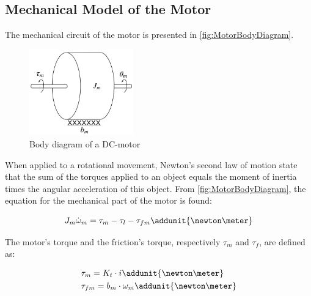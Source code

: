 \subsection*{Mechanical Model of the Motor}
The mechanical circuit of the motor is presented in \autoref{fig:MotorBodyDiagram}.

\begin{figure}[htbp]
	\centering
 	\includegraphics[width=0.4\textwidth]{figures/modeling/Motor/DCMotorMechanic.pdf} 
 	\caption{Body diagram of a DC-motor}
 	\label{fig:MotorBodyDiagram}
\end{figure}

When applied to a rotational movement, Newton's second law of motion state that the sum of the torques applied to an object equals the moment of inertia times the angular acceleration of this object. From \autoref{fig:MotorBodyDiagram}, the equation for the mechanical part of the motor is found:

\begin{equation}
	J_{m} \dot{\omega}_{m} = \tau_{m} - \tau_{l} - \tau_{fm} \addunit{\newton\meter}
	\label{eq:MotorMechanical}
\end{equation}

\startexplain
\stopexplain

The motor's torque and the friction's torque, respectively $\tau_m$ and $\tau_f$, are defined as:

\begin{subequations}\label{eq:tauLm}
	\begin{flalign}
		&\tau_m = K_t \cdot i \addunit{\newton\meter} \label{eq:MotorTorque}\\	
		&\tau_{fm} = b_{m}\cdot\omega_{m} \addunit{\newton\meter}	\label{eq:FrictionTorque}
	\end{flalign}
\end{subequations}


